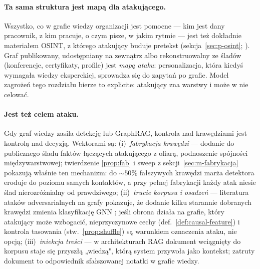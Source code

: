 \paragraph{Ta sama struktura jest mapą dla atakującego.}
Wszystko, co w grafie wiedzy organizacji jest pomocne --- kim
jest dany pracownik, z kim pracuje, o czym pisze, w jakim rytmie
--- jest też dokładnie materiałem OSINT, z którego atakujący
buduje pretekst (sekcja~\ref{sec:p-osint}; \citealp{edwards2017panning,
brown2025web}). Graf publikowany, udostępniany na zewnątrz
albo rekonstruowalny ze śladów (konferencje, certyfikaty,
profile) jest \emph{mapą ataku}: personalizacja, która kiedyś
wymagała wiedzy eksperckiej, sprowadza się do zapytań po
grafie. Model zagrożeń tego rozdziału bierze to explicite:
atakujący zna warstwy i może w nie celować.

\paragraph{Jest też celem ataku.} Gdy graf wiedzy zasila detekcję
lub GraphRAG, kontrola nad krawędziami jest kontrolą nad
decyzją. Wektorami są: (i)~\emph{fabrykacja krawędzi} --- dodanie
do publicznego śladu faktów łączących atakującego z ofiarą,
podnoszenie spójności międzywarstwowej; twierdzenie
\ref{prop:fab} i sweep z sekcji~\ref{sec:m-fabrykacja} pokazują
właśnie ten mechanizm: do $\sim\!50\%$ fałszywych krawędzi
marża detektora eroduje do poziomu samych kontaktów, a przy
pełnej fabrykacji każdy atak niesie ślad nierozróżnialny
od prawdziwego; (ii)~\emph{trucie korpusu i osadzeń} ---
literatura ataków adversarialnych na grafy pokazuje, że
dodanie kilku starannie dobranych krawędzi zmienia klasyfikację
GNN \citep{zugner2018adversarial,zugner2019adversarial,
dai2022towards}; jeśli obrona działa na grafie, który atakujący
może wzbogacić, nieprzyczynowe cechy (def.~\ref{def:causal-feature})
i kontrola tasowania (stw.~\ref{prop:shuffle}) są warunkiem
oznaczenia ataku, nie opcją; (iii)~\emph{iniekcja treści} ---
w architekturach RAG dokument wciągnięty do korpusu staje się
przyszłą „wiedzą", którą system przywoła jako kontekst;
zatruty dokument to odpowiednik sfałszowanej notatki
w grafie wiedzy.

